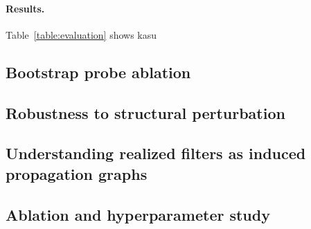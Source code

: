 \documentclass[runningheads]{llncs}
\begin{document}
\paragraph{Results.}
Table~\ref{table:evaluation} shows kasu


\subsection{Bootstrap probe ablation}


\subsection{Robustness to structural perturbation}


\subsection{Understanding realized filters as induced propagation graphs}


\subsection{Ablation and hyperparameter study}

\end{document}
